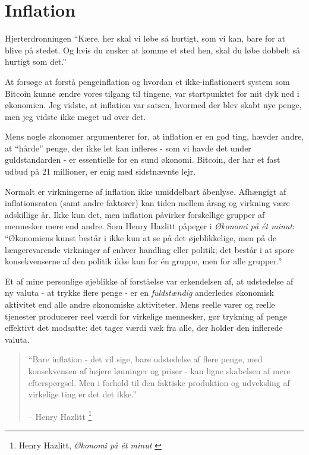 \chapter{Inflation}
\label{les:9}

\begin{chapquote}{Hjerterdronningen}
\enquote{Kære, her skal vi løbe så hurtigt, som vi kan, bare for at blive på 
stedet. Og hvis du ønsker at komme et sted hen, skal du løbe dobbelt så 
hurtigt som det.}
\end{chapquote}

At forsøge at forstå pengeinflation og hvordan et ikke-inflationært system 
som Bitcoin kunne ændre vores tilgang til tingene, var startpunktet for mit 
dyk ned i økonomien. Jeg vidste, at inflation var satsen, hvormed der blev 
skabt nye penge, men jeg vidste ikke meget ud over det.

Mens nogle økonomer argumenterer for, at inflation er en god ting, hævder 
andre, at \enquote{hårde} penge, der ikke let kan infleres - som vi havde 
det under guldstandarden - er essentielle for en sund økonomi. Bitcoin, der 
har et fast udbud på 21 millioner, er enig med sidstnævnte lejr.

Normalt er virkningerne af inflation ikke umiddelbart åbenlyse. Afhængigt af 
inflationsraten (samt andre faktorer) kan tiden mellem årsag og virkning være 
adskillige år. Ikke kun det, men inflation påvirker forskellige grupper af
mennesker mere end andre. Som Henry Hazlitt påpeger i \textit{Økonomi på ét 
minut}: \enquote{Økonomiens kunst består i ikke kun at se på det øjeblikkelige, 
men på de længerevarende virkninger af enhver handling eller politik; det 
består i at spore konsekvenserne af den politik ikke kun for én gruppe, men 
for alle grupper.}

Et af mine personlige øjeblikke af forståelse var erkendelsen af, at udstedelse 
af ny valuta - at trykke flere penge - er en \textit{fuldstændig} anderledes
økonomisk aktivitet end alle andre økonomiske aktiviteter. Mens reelle varer 
og reelle tjenester producerer reel værdi for virkelige mennesker, gør trykning 
af penge effektivt det modsatte: det tager værdi væk fra alle, der holder den 
inflerede valuta.

\begin{quotation}\begin{samepage}
\enquote{Bare inflation - det vil sige, bare udstedelse af flere penge, med 
konsekvensen af højere lønninger og priser - kan ligne skabelsen af mere 
efterspørgsel. Men i forhold til den faktiske produktion og udveksling af 
virkelige ting er det det ikke.} \begin{flushright} -- Henry Hazlitt
    \footnote{Henry Hazlitt, \textit{Økonomi på ét minut} \cite{hazlitt}}
\end{flushright}\end{samepage}\end{quotation}

